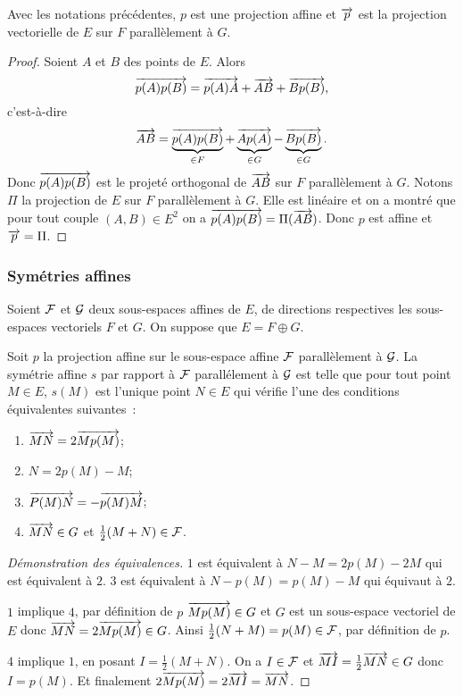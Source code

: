\begin{prop}
  Avec les notations précédentes, $p$ est une projection affine et $\overrightarrow{p}$ est la projection vectorielle de $E$ sur $F$ parallèlement à $G$.
\end{prop}
\begin{proof}
  Soient $A$ et $B$ des points de $E$. Alors
  \begin{equation}
    \overrightarrow{p(A)p(B)} = \overrightarrow{p(A)A} + \overrightarrow{AB} + \overrightarrow{Bp(B)},
  \end{equation}
  c'est-à-dire
  \begin{equation}
    \overrightarrow{AB} = \underbrace{\overrightarrow{p(A)p(B)}}_{\in F} + \underbrace{\overrightarrow{Ap(A)}}_{\in G} - \underbrace{\overrightarrow{Bp(B)}}_{\in G}.
  \end{equation}
  Donc $\overrightarrow{p(A)p(B)}$ est le projeté orthogonal de $\overrightarrow{AB}$ sur $F$ parallèlement à $G$. Notons $\Pi$ la projection de $E$ sur $F$ parallèlement à $G$. Elle est linéaire et on a montré que pour tout couple $(A,B) \in E^2$ on a $\overrightarrow{p(A)p(B)} = \Pi(\overrightarrow{AB})$. Donc $p$ est affine et $\overrightarrow{p}=\Pi$.
\end{proof}

\subsubsection{Symétries affines}

Soient $\mathcal{F}$ et $\mathcal{G}$ deux sous-espaces affines de $E$, de directions respectives les sous-espaces vectoriels $F$ et $G$. On suppose que $E=F \oplus G$.

\begin{defdef}
  Soit $p$ la projection affine sur le sous-espace affine $\mathcal{F}$ parallèlement à $\mathcal{G}$. La symétrie affine $s$ par rapport à $\mathcal{F}$ parallélement à $\mathcal{G}$ est telle que pour tout point $M \in E$, $s(M)$ est l'unique point $N \in E$ qui vérifie l'une des conditions équivalentes suivantes~:
  \begin{enumerate}
  \item $\overrightarrow{MN}=2\overrightarrow{Mp(M)}$;
  \item $N = 2p(M)-M$;
  \item $\overrightarrow{P(M)N}=-\overrightarrow{p(M)M}$;
  \item $\overrightarrow{MN} \in G$ et $\frac{1}{2}(M+N) \in \mathcal{F}$.
  \end{enumerate}
\end{defdef}
\begin{proof}[Démonstration des équivalences]
  $1$ est équivalent à $N-M=2p(M)-2M$ qui est équivalent à $2$. $3$ est équivalent à $N-p(M)=p(M)-M$ qui équivaut à $2$. 

  $1$ implique $4$, par définition de $p$ $\overrightarrow{Mp(M)} \in G$ et $G$ est un sous-espace vectoriel de $E$ donc $\overrightarrow{MN}=2\overrightarrow{Mp(M)} \in G$. Ainsi $\frac{1}{2}(N+M) = p(M) \in \mathcal{F}$, par définition de $p$.

  $4$ implique $1$, en posant $I = \frac{1}{2}(M+N)$. On a $I \in \mathcal{F}$ et $\overrightarrow{MI} = \frac{1}{2}\overrightarrow{MN} \in G$ donc $I=p(M)$. Et finalement $2\overrightarrow{Mp(M)} = 2\overrightarrow{MI}=\overrightarrow{MN}$.
\end{proof}

